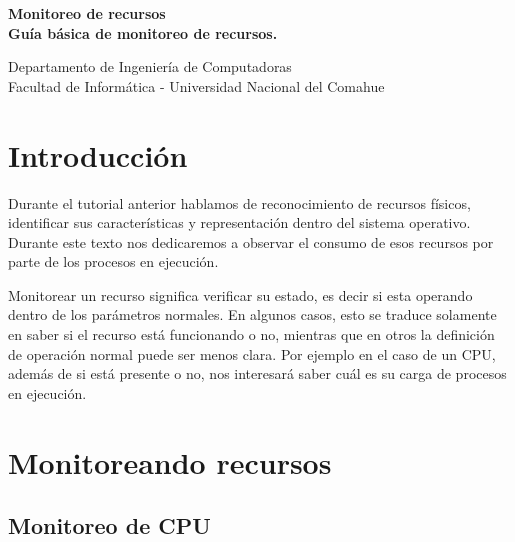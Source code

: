 \documentclass[12pt]{article}
\def\maketitle{

 \makeatletter
 {\color{bl} \centering \huge \sc \textbf{
 Monitoreo de recursos \\ 
\large \vspace*{-8pt} \color{black} Guía básica de monitoreo de recursos. 
 \vspace*{8pt} }\par}
 \makeatother


 \makeatletter
 {\centering \small 
 	Departamento de Ingeniería de Computadoras \\
 	Facultad de Informática - Universidad Nacional del Comahue \\
 	\vspace{20pt} }
 \makeatother

}
\begin{document}
\thispagestyle{empty}
\maketitle
\setlength{\parindent}{0pt}

\section*{Introducción}

Durante el tutorial anterior hablamos de reconocimiento de recursos físicos, identificar 
sus características y representación dentro del sistema operativo. Durante este texto nos dedicaremos a observar el consumo de esos recursos por parte de los procesos en ejecución. 

Monitorear un recurso significa verificar su estado, es decir si esta operando
dentro de los parámetros normales. En algunos casos, esto se traduce 
solamente en saber si el recurso está funcionando o no, mientras que en otros
la definición de operación normal puede ser menos clara. Por ejemplo en el 
caso de un CPU, además de si está presente o no, nos interesará saber cuál es 
su carga de procesos en ejecución. 
 

\section*{Monitoreando recursos}




\subsection*{Monitoreo de CPU}


\end{document}
